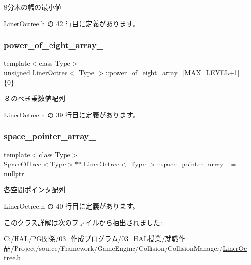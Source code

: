 8分木の幅の最小値 



 Liner\+Octree.\+h の 42 行目に定義があります。

\mbox{\label{class_liner_octree_ab7ddbc8f86cfa3ff46f01f080b56572a}} 
\subsubsection{\texorpdfstring{power\+\_\+of\+\_\+eight\+\_\+array\+\_\+}{power\_of\_eight\_array\_}}
{\footnotesize\ttfamily template$<$class Type$>$ \\
unsigned \mbox{\hyperlink{class_liner_octree}{Liner\+Octree}}$<$ Type $>$\+::power\+\_\+of\+\_\+eight\+\_\+array\+\_\+\mbox{[}\mbox{\hyperlink{class_liner_octree_aced865f2822181486eb805e4db1f0a32}{M\+A\+X\+\_\+\+L\+E\+V\+EL}}+1\mbox{]} = \{0\}\hspace{0.3cm}{\ttfamily [private]}}



８のべき乗数値配列 



 Liner\+Octree.\+h の 39 行目に定義があります。

\mbox{\label{class_liner_octree_a0ffc2effd42779c7f88c4eecc8a68bfb}} 
\subsubsection{\texorpdfstring{space\+\_\+pointer\+\_\+array\+\_\+}{space\_pointer\_array\_}}
{\footnotesize\ttfamily template$<$class Type$>$ \\
\mbox{\hyperlink{class_space_of_tree}{Space\+Of\+Tree}}$<$Type$>$$\ast$$\ast$ \mbox{\hyperlink{class_liner_octree}{Liner\+Octree}}$<$ Type $>$\+::space\+\_\+pointer\+\_\+array\+\_\+ = nullptr\hspace{0.3cm}{\ttfamily [private]}}



各空間ポインタ配列 



 Liner\+Octree.\+h の 40 行目に定義があります。



このクラス詳解は次のファイルから抽出されました\+:\begin{DoxyCompactItemize}
\item 
C\+:/\+H\+A\+L/\+P\+G関係/03\+\_\+作成プログラム/03\+\_\+\+H\+A\+L授業/就職作品/\+Project/source/\+Framework/\+Game\+Engine/\+Collision/\+Collision\+Manager/\mbox{\hyperlink{_liner_octree_8h}{Liner\+Octree.\+h}}\end{DoxyCompactItemize}
